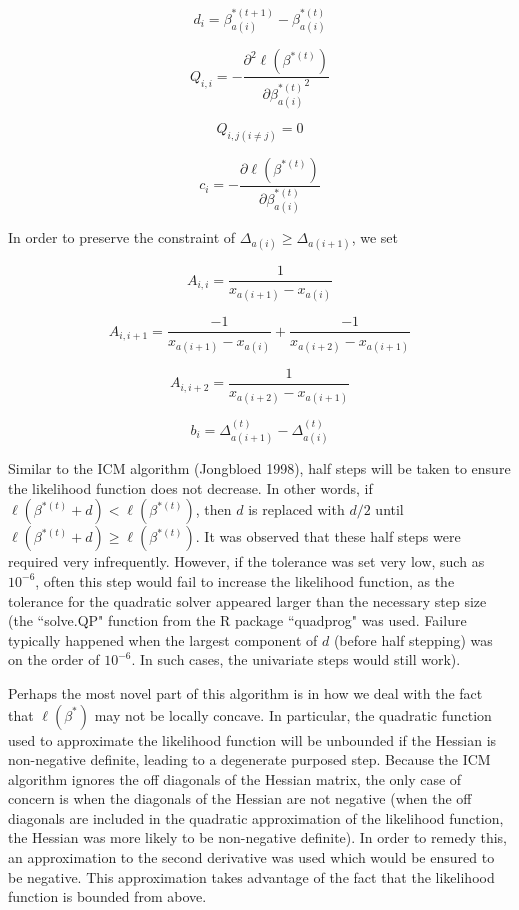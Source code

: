	\[ d_i = \beta^{*(t+1)}_{a(i)} - \beta^{*(t)}_{a(i)}
	\]
	
	\[Q_{i,i} = - \frac{\partial^2 \ell(\beta^{*(t)} )} {\partial {\beta^{*(t)}_{a(i)}}^2}
	\]
	 
	 \[
	 Q_{i,j (i\neq j)} = 0
	 \]
	 
	\[c_i = -\frac{\partial \ell(\beta^{*(t)})} {\partial \beta_{a(i)}^{*(t)} }
	\]
	
	In order to preserve the constraint of $\Delta_{a(i)} \geq \Delta_{a(i+1)}$, we set 
	
	\[ A_{i,i} = \frac{1}{x_{a(i+1)} - x_{a(i)} }
	\]
	
	\[ A_{i, i + 1} = \frac{-1}{x_{a(i+1)} - x_{a(i)} } + \frac{-1}{x_{a(i+2)} - x_{a(i + 1)} }
	\]
	
	\[ A_{i, i + 2} = \frac{1}{x_{a(i+2)} - x_{a(i + 1)} }
	\]
	
	\[ b_i =\Delta_{a(i + 1)}^{(t)} - \Delta_{a(i)}^{(t)}
	\]
	
	Similar to the ICM algorithm (Jongbloed 1998), half steps will be taken to ensure the likelihood function does not decrease. In other words, if $\ell ( \beta^{*(t)} + d ) < \ell ( \beta^{*(t)}  ) $, then $d$ is replaced with $d/2$ until $\ell ( \beta^{*(t)} + d ) \geq \ell ( \beta^{*(t)} )$. It was observed that these half steps were required very infrequently. However, if the tolerance was set very low, such as $10^{-6}$, often this step would fail to increase the likelihood function, as the tolerance for the quadratic solver appeared larger than the necessary step size (the ``solve.QP" function from the R package ``quadprog" was used. Failure typically happened when the largest component of $d$ (before half stepping) was on the order of $10^{-6}$. In such cases, the univariate steps would still work). 
	
	Perhaps the most novel part of this algorithm is in how we deal with the fact that $\ell(\beta^*)$ may not be locally concave. In particular, the quadratic function used to approximate the likelihood function will be unbounded if the Hessian is non-negative definite, leading to a degenerate purposed step. Because the ICM algorithm ignores the off diagonals of the Hessian matrix, the only case of concern is when the diagonals of the Hessian are not negative (when the off diagonals are included in the quadratic approximation of the likelihood function, the Hessian was more likely to be non-negative definite). In order to remedy this, an approximation to the second derivative was used which would be ensured to be negative. This approximation takes advantage of the fact that the likelihood function is bounded from above. 
		
